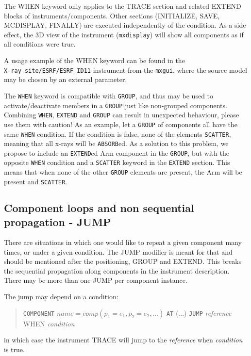 The WHEN keyword only applies to the TRACE section and related EXTEND blocks of instruments/components. Other sections (INITIALIZE, SAVE, MCDISPLAY, FINALLY) are executed
independently of the condition. As a side effect, the 3D view of the instrument (\texttt{mxdisplay}) will show all components as if all conditions were true.

A usage example of the WHEN keyword can be found in the \\
\verb+X-ray site/ESRF/ESRF_ID11+ instrument from the \verb+mxgui+, where the source model may be chosen by an external parameter.

The \texttt{WHEN} keyword is compatible with \texttt{GROUP}, and thus may be used to activate/deactivate members in a \texttt{GROUP} just like non-grouped components. 
Combining \texttt{WHEN}, \texttt{EXTEND} and \texttt{GROUP} can result in unexpected behaviour, please use them with caution! As an example, let a \texttt{GROUP} of components all
have the same \texttt{WHEN} condition.
If the condition is false, none of the elements \texttt{SCATTER}, meaning that all x-rays will be \texttt{ABSORB}ed. As a solution to this problem, we propose to include an
\texttt{EXTEND}ed Arm
component in the \texttt{GROUP}, but with the opposite \texttt{WHEN} condition and a \texttt{SCATTER} keyword in the \texttt{EXTEND} section. This means that when none of the other
\texttt{GROUP} elements are present, the Arm
will be present and \texttt{SCATTER}.


\subsection{Component loops and non sequential propagation - JUMP}
\label{s:instrdefs-extend-jump}

There are situations in which one would like to repeat a given component many times, or under a given condition. The JUMP modifier is meant for that and should be mentioned after
the positioning, GROUP and EXTEND. This breaks the sequential propagation along components in the instrument description. There may be more than one JUMP per component instance.

The jump may depend on a condition:
\begin{quote}
  \texttt{COMPONENT} $\textit{name} = \textit{comp}(p_1 = e_1, p_2 = e_2, \ldots)$
  \texttt{AT} (...)
  \texttt{JUMP} \textit{reference} WHEN \textit{condition}
\end{quote}
in which case the instrument TRACE will jump to the \textit{reference} when \textit{condition} is true.

